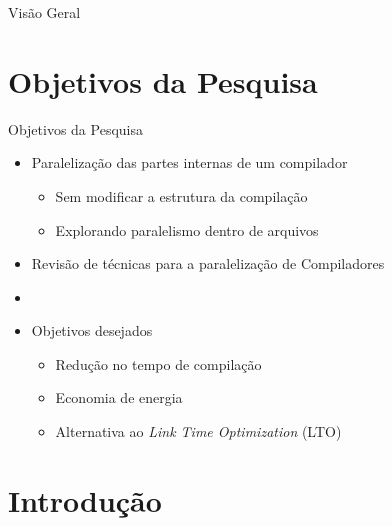 \customtitlepage


\begin{frame}{Visão Geral}
  \overview
\end{frame}

\section{Objetivos da Pesquisa}

\begin{frame}{Objetivos da Pesquisa}
    \begin{itemize}
        \item Paralelização das partes internas de um compilador
        \begin{itemize}
            \item Sem modificar a estrutura da compilação
            \item Explorando paralelismo dentro de arquivos
        \end{itemize}
        \item Revisão de técnicas para a paralelização de Compiladores
        \item[]
        \item Objetivos desejados
        \begin{itemize}
            \item Redução no tempo de compilação
            \item Economia de energia
            \item Alternativa ao \textit{Link Time Optimization} (LTO)
        \end{itemize}
    \end{itemize}
\end{frame}

\section{Introdução}

